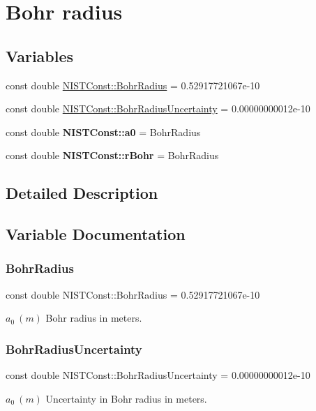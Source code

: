 \hypertarget{group___bohr_radius}{}\section{Bohr radius}
\label{group___bohr_radius}
\subsection*{Variables}
\begin{DoxyCompactItemize}
\item 
const double \hyperlink{group___bohr_radius_ga38bdb86c2f3e484e8b164e75a3980638}{N\+I\+S\+T\+Const\+::\+Bohr\+Radius} = 0.\+52917721067e-\/10
\item 
const double \hyperlink{group___bohr_radius_gad031da8c7a2e239441e06c10fd8f6f07}{N\+I\+S\+T\+Const\+::\+Bohr\+Radius\+Uncertainty} = 0.\+00000000012e-\/10
\item 
\mbox{\label{group___bohr_radius_gaa79b6b930d252d0cda2711c7993e918a}} 
const double {\bfseries N\+I\+S\+T\+Const\+::a0} = Bohr\+Radius
\item 
\mbox{\label{group___bohr_radius_gad2a74a106c13086263e42411835b6352}} 
const double {\bfseries N\+I\+S\+T\+Const\+::r\+Bohr} = Bohr\+Radius
\end{DoxyCompactItemize}


\subsection{Detailed Description}


\subsection{Variable Documentation}
\mbox{\label{group___bohr_radius_ga38bdb86c2f3e484e8b164e75a3980638}} 
\subsubsection{\texorpdfstring{Bohr\+Radius}{BohrRadius}}
{\footnotesize\ttfamily const double N\+I\+S\+T\+Const\+::\+Bohr\+Radius = 0.\+52917721067e-\/10}

$a_0 \ (m)$ Bohr radius in meters. \mbox{\label{group___bohr_radius_gad031da8c7a2e239441e06c10fd8f6f07}} 
\subsubsection{\texorpdfstring{Bohr\+Radius\+Uncertainty}{BohrRadiusUncertainty}}
{\footnotesize\ttfamily const double N\+I\+S\+T\+Const\+::\+Bohr\+Radius\+Uncertainty = 0.\+00000000012e-\/10}

$a_0 \ (m)$ Uncertainty in Bohr radius in meters. 